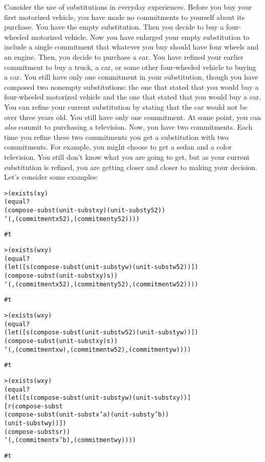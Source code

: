 Consider the use of substitutions in everyday experiences.  Before you
buy your first motorized vehicle, you have made no commitments to
yourself about its purchase.  You have the empty substitution.  Then
you decide to buy a four-wheeled motorized vehicle.  Now you have
enlarged your empty substitution to include a single commitment that
whatever you buy should have four wheels and an engine.  Then, you
decide to purchase a car.  You have refined your earlier commitment to
buy a truck, a car, or some other four-wheeled vehicle to buying a
car.  You still have only one commitment in your substitution, though
you have composed two nonempty substitutions: the one that stated that
you would buy a four-wheeled motorized vehicle and the one that stated
that you would buy a car.  You can refine your current substitution by
stating that the car would not be over three years old.  You still
have only one commitment.  At some point, you can \emph{also} commit
to purchasing a television.  Now, you have two commitments.  Each time
you refine these two commitments you get a substitution with two
commitments.  For example, you might choose to get a sedan and a color
television.  You still don't know what you are going to get, but as
your current substitution is refined, you are getting closer and
closer to making your decision.
\newpage
Let's consider some examples:

\begin{alltt}
> (exists (x y)
    (equal?
      (compose-subst (unit-subst x y) (unit-subst y 52))
      `(,(commitment x 52) ,(commitment y 52))))

#t
\end{alltt}

\begin{alltt}
> (exists (w x y)
    (equal?
      (let ([s (compose-subst (unit-subst y w) (unit-subst w 52))])
        (compose-subst (unit-subst x y) s))
      `(,(commitment x 52) ,(commitment y 52) ,(commitment w 52))))

#t
\end{alltt}

\begin{alltt}
> (exists (w x y)
    (equal?
      (let ([s (compose-subst (unit-subst w 52) (unit-subst y w))])
        (compose-subst (unit-subst x y) s))
      `(,(commitment x w) ,(commitment w 52) ,(commitment y w))))

#t
\end{alltt}

\begin{alltt}
> (exists (w x y)
    (equal?
      (let ([s (compose-subst (unit-subst y w) (unit-subst x y))]
            [r (compose-subst
                 (compose-subst (unit-subst x 'a) (unit-subst y 'b))
                 (unit-subst w y))])
        (compose-subst s r))
      `(,(commitment x 'b) ,(commitment w y))))

#t
\end{alltt}

